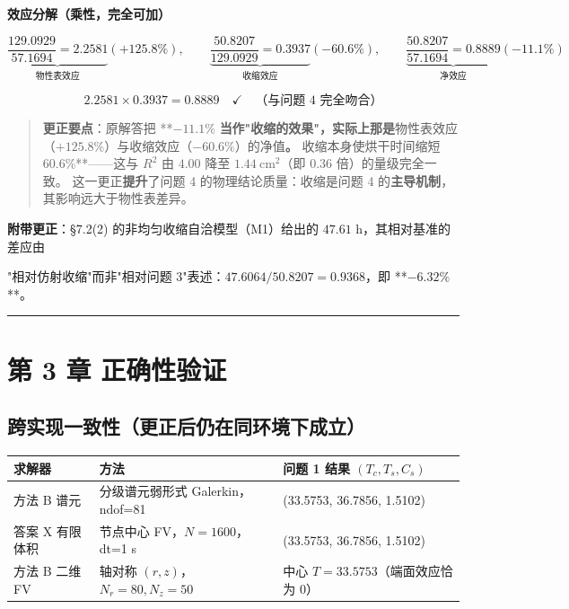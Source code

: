 \textbf{效应分解（乘性，完全可加）}


\begin{equation*}
\underbrace{\frac{129.0929}{57.1694}=2.2581}_{\text{物性表效应}}(+125.8\%),\qquad
\underbrace{\frac{50.8207}{129.0929}=0.3937}_{\text{收缩效应}}(\mathbf{-60.6\%}),\qquad
\underbrace{\frac{50.8207}{57.1694}=0.8889}_{\text{净效应}}(-11.1\%)
\end{equation*}


\begin{equation*}
2.2581\times0.3937=0.8889\quad\checkmark\quad\text{（与问题 4 完全吻合）}
\end{equation*}


\begin{quote}
\textbf{更正要点}：原解答把 **$-11.1\%$\textbf{ 当作"收缩的效果"，实际上那是}物性表效应（$+125.8\%$）与收缩效应（$-60.6\%$）的净值\textbf{。 }收缩本身使烘干时间缩短 60.6\%**——这与 $R^2$ 由 $4.00$ 降至 $1.44\ \mathrm{cm^2}$（即 $0.36$ 倍）的量级完全一致。  这一更正\textbf{提升}了问题 4 的物理结论质量：收缩是问题 4 的\textbf{主导机制}，其影响远大于物性表差异。
\end{quote}


\textbf{附带更正}：§7.2(2) 的非均匀收缩自洽模型（M1）给出的 $47.61$ h，其相对基准的差应由

"相对仿射收缩"而非"相对问题 3"表述：$47.6064/50.8207=0.9368$，即 **$-6.32\%$**。


\vspace{1mm}\hrule\vspace{1mm}


\section{第 3 章 正确性验证}


\subsection{跨实现一致性（更正后仍在同环境下成立）}


\begin{center}
\small
\begin{tabular}{lll}
\toprule
求解器 & 方法 & 问题 1 结果 $(T_c,T_s,C_s)$ \\
\midrule
方法 B 谱元 & 分级谱元弱形式 Galerkin，ndof=81 & (33.5753, 36.7856, 1.5102) \\
答案 X 有限体积 & 节点中心 FV，$N=1600$，dt=1 s & (33.5753, 36.7856, 1.5102) \\
方法 B 二维 FV & 轴对称 $(r,z)$，$N_r=80,N_z=50$ & 中心 $T=33.5753$（端面效应恰为 0） \\
\bottomrule
\end{tabular}
\end{center}


